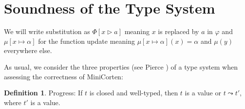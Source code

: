 \documentclass[twoside, english]{sdqthesis}
\newcommand{\tr}[0]{\triangleright}
\theoremstyle{definition}
\newtheorem{definition}[theorem]{Definition}
\begin{document}


\section{Soundness of the Type System}\label{sec:soundness}

We will write substitution as $\Phi[ x \tr a ]$ meaning $x$ is replaced by $a$ in $\varphi$ and $\mu[x \mapsto \alpha]$ for the function update meaning $\mu[x \mapsto \alpha](x) = \alpha$ and $\mu(y)$ everywhere else.

As usual, we consider the three properties (see Pierce \cite[p. 95, p.167]{pierce_types_2002}) of a type system when assessing the correctness of MiniCorten:

\begin{definition}
  Progress:
    If $t$ is closed and well-typed, then $t$ is a value or $t \leadsto t'$, where $t'$ is a value.
\end{definition}
\end{document}
